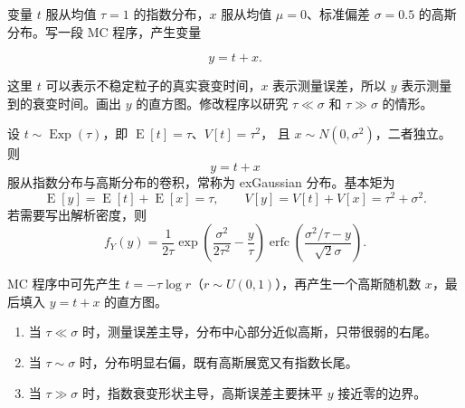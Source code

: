 \begin{question}
变量 \(t\) 服从均值 \(\tau=1\) 的指数分布，\(x\) 服从均值
\(\mu=0\)、标准偏差 \(\sigma=0.5\) 的高斯分布。写一段 MC 程序，产生变量

\[
y=t+x.
\]

这里 \(t\) 可以表示不稳定粒子的真实衰变时间，\(x\) 表示测量误差，所以
\(y\) 表示测量到的衰变时间。画出 \(y\) 的直方图。修改程序以研究
\(\tau\ll\sigma\) 和 \(\tau\gg\sigma\) 的情形。
\begin{solution}
设 \(t\sim\operatorname{Exp}(\tau)\)，即 \(\operatorname{E}[t]=\tau\)、\(V[t]=\tau^2\)，
且 \(x\sim N(0,\sigma^2)\)，二者独立。则
\[
y=t+x
\]
服从指数分布与高斯分布的卷积，常称为 exGaussian 分布。基本矩为
\[
\operatorname{E}[y]=\operatorname{E}[t]+\operatorname{E}[x]=\tau,
\qquad
V[y]=V[t]+V[x]=\tau^2+\sigma^2.
\]
若需要写出解析密度，则
\[
f_Y(y)=\frac{1}{2\tau}
\exp\left(\frac{\sigma^2}{2\tau^2}-\frac{y}{\tau}\right)
\operatorname{erfc}\left(\frac{\sigma^2/\tau-y}{\sqrt2\sigma}\right).
\]

MC 程序中可先产生 \(t=-\tau\log r\)（\(r\sim U(0,1)\)），再产生一个高斯随机数
\(x\)，最后填入 \(y=t+x\) 的直方图。
\begin{enumerate}
\item 当 \(\tau\ll\sigma\) 时，测量误差主导，分布中心部分近似高斯，只带很弱的右尾。
\item 当 \(\tau\sim\sigma\) 时，分布明显右偏，既有高斯展宽又有指数长尾。
\item 当 \(\tau\gg\sigma\) 时，指数衰变形状主导，高斯误差主要抹平 \(y\) 接近零的边界。
\end{enumerate}
\end{solution}
\end{question}


